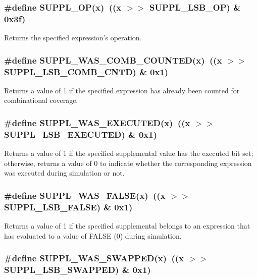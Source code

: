 \subsubsection{\setlength{\rightskip}{0pt plus 5cm}\#define SUPPL\_\-OP(x)\ ((x $>$$>$ SUPPL\_\-LSB\_\-OP) \& 0x3f)}\label{group__expr__suppl_a34}


Returns the specified expression's operation. 
\subsubsection{\setlength{\rightskip}{0pt plus 5cm}\#define SUPPL\_\-WAS\_\-COMB\_\-COUNTED(x)\ ((x $>$$>$ SUPPL\_\-LSB\_\-COMB\_\-CNTD) \& 0x1)}\label{group__expr__suppl_a33}


Returns a value of 1 if the specified expression has already been counted for combinational coverage. 
\subsubsection{\setlength{\rightskip}{0pt plus 5cm}\#define SUPPL\_\-WAS\_\-EXECUTED(x)\ ((x $>$$>$ SUPPL\_\-LSB\_\-EXECUTED) \& 0x1)}\label{group__expr__suppl_a23}


Returns a value of 1 if the specified supplemental value has the executed bit set; otherwise, returns a value of 0 to indicate whether the corresponding expression was executed during simulation or not. 
\subsubsection{\setlength{\rightskip}{0pt plus 5cm}\#define SUPPL\_\-WAS\_\-FALSE(x)\ ((x $>$$>$ SUPPL\_\-LSB\_\-FALSE) \& 0x1)}\label{group__expr__suppl_a30}


Returns a value of 1 if the specified supplemental belongs to an expression that has evaluated to a value of FALSE (0) during simulation. 
\subsubsection{\setlength{\rightskip}{0pt plus 5cm}\#define SUPPL\_\-WAS\_\-SWAPPED(x)\ ((x $>$$>$ SUPPL\_\-LSB\_\-SWAPPED) \& 0x1)}\label{group__expr__suppl_a21}


